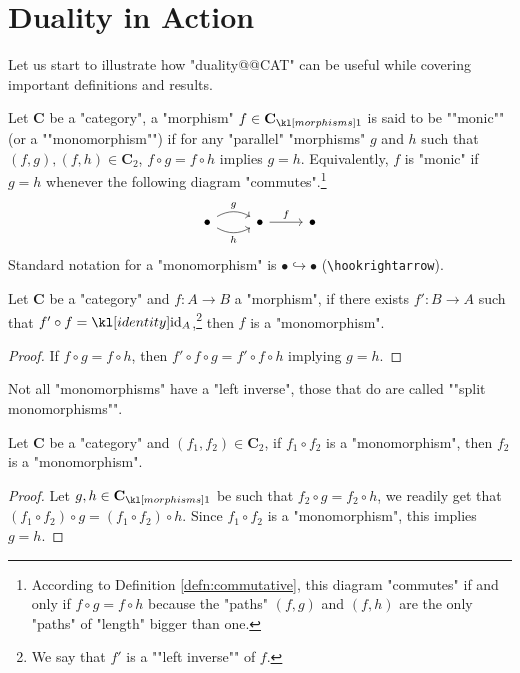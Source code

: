 \documentclass[main.tex]{subfiles}
\begin{document}
\section{Duality in Action}
Let us start to illustrate how "duality@@CAT" can be useful while covering important definitions and results.
\begin{defn}[Monomorphism]
	\AP Let $\mathbf{C}$ be a "category", a "morphism" $f \in \mor{\mathbf{C}}$ is said to be ""monic"" (or a ""monomorphism"") if for any "parallel" "morphisms" $g$ and $h$ such that $(f,g), (f,h) \in \mathbf{C}_2$, $f\circ g = f\circ h$ implies $g = h$. Equivalently, $f$ is "monic" if $g = h$ whenever the following diagram "commutes".\footnote{According to Definition \ref{defn:commutative}, this diagram "commutes" if and only if $f \circ g = f \circ h$ because the "paths" $(f,g)$ and $(f,h)$ are the only "paths" of "length" bigger than one.}
	\begin{equation}\label{diag:defmonic}
		\begin{tikzcd}
		\bullet \arrow[r, "h"', bend right] \arrow[r, "g", bend left] & \bullet \arrow[r, "f"] & \bullet
		\end{tikzcd}
	\end{equation}
	Standard notation for a "monomorphism" is $ \bullet \hookrightarrow \bullet $ (\verb!\hookrightarrow!).
\end{defn}
\begin{prop}\label{prop:mon1}
	Let $\mathbf{C}$ be a "category" and $f:A\rightarrow B$ a "morphism", if there exists $f': B\rightarrow A$ such that $f'\circ f = \id_A$,\footnote{\AP We say that $f'$ is a ""left inverse"" of $f$.} then $f$ is a "monomorphism".
\end{prop}
\begin{proof}
	If $f\circ g = f\circ h$, then $f'\circ f \circ g = f'\circ f \circ h$ implying $g = h$.
\end{proof}
\AP Not all "monomorphisms" have a "left inverse", those that do are called ""split monomorphisms"".
\begin{prop}\label{prop:mon2}
	Let $\mathbf{C}$ be a "category" and $(f_1, f_2) \in \mathbf{C}_2$, if $f_1 \circ f_2$ is a "monomorphism", then $f_2$ is a "monomorphism".
\end{prop}
\begin{proof}
	Let $g,h \in \mor{\mathbf{C}}$ be such that $f_2\circ g = f_2\circ h$, we readily get that $(f_1\circ f_2)\circ g = (f_1 \circ f_2) \circ h$. Since $f_1\circ f_2$ is a "monomorphism", this implies $g = h$.
\end{proof}
\end{document}
